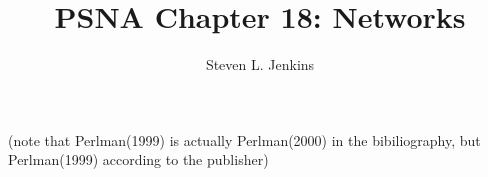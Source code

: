 \documentclass{slides}
\title{PSNA Chapter 18: Networks}
\author{Steven L. Jenkins}
\begin{document}

(note that Perlman(1999) is actually Perlman(2000) in the bibiliography,
but Perlman(1999) according to the publisher)
\end{document}
